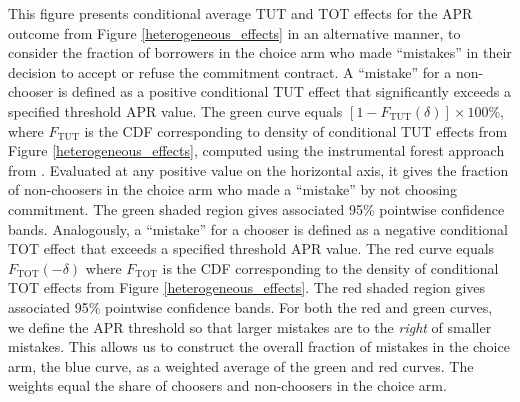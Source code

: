 \documentclass[oneside,11pt]{article}
\begin{document}
\begin{figure}[H]
\end{figure}


This figure presents conditional average TUT and TOT effects for the APR outcome from Figure \ref{heterogeneous_effects} in an alternative manner, to consider the fraction of borrowers in the choice arm who made ``mistakes'' in their decision to accept or refuse the commitment contract. A ``mistake'' for a non-chooser is defined as a positive conditional TUT effect that significantly exceeds a specified threshold APR value. The green curve equals $[1 - F_{\text{TUT}}(\delta)]\times 100\%$, where $F_{\text{TUT}}$ is the CDF corresponding to density of conditional TUT effects from Figure \ref{heterogeneous_effects}, computed using the instrumental forest approach from \cite{atheygrf}. Evaluated at any positive value on the horizontal axis, it gives the fraction of non-choosers in the choice arm who made a ``mistake'' by not choosing commitment. The green shaded region gives associated 95\% pointwise confidence bands. 
Analogously, a ``mistake'' for a chooser is defined as a negative conditional TOT effect that exceeds a specified threshold APR value. The red curve equals $F_{\text{TOT}}(-\delta)$ where $F_{\text{TOT}}$ is the CDF corresponding to the density of conditional TOT effects from Figure \ref{heterogeneous_effects}. 
The red shaded region gives associated 95\% pointwise confidence bands.
For both the red and green curves, we define the APR threshold so that larger mistakes are to the \emph{right} of smaller mistakes.
This allows us to construct the overall fraction of mistakes in the choice arm, the blue curve, as a weighted average of the green and red curves.
The weights equal the share of choosers and non-choosers in the choice arm.

\end{document}
